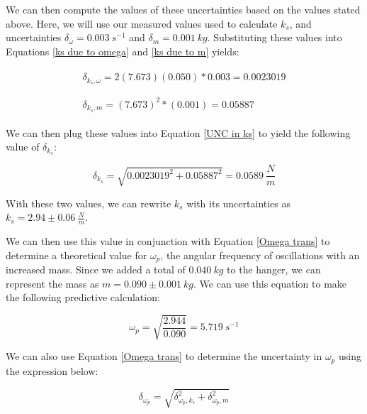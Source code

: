 \documentclass[12pt]{article}
\begin{document}
We can then compute the values of these uncertainties based on the values stated above. Here, we will use our measured values used to calculate $k_s$, and uncertainties $\delta_\omega=0.003\ s^{-1}$ and $\delta_m=0.001\ kg$. Substituting these values into Equations \ref{ks due to omega} and \ref{ks due to m} yields:

\begin{align*}
    \begin{split}
        \delta_{k_s,\omega}=2(7.673)(0.050)*0.003=0.0023019
    \end{split} \\ \\
    \begin{split}
        \delta_{k_s,m}=(7.673)^2*(0.001)=0.05887
    \end{split}
\end{align*}

We can then plug these values into Equation \ref{UNC in ks} to yield the following value of $\delta_{k_s}$:

\begin{equation*}
    \delta_{k_s}=\sqrt{0.0023019^2+0.05887^2}=0.0589\ \frac{N}{m}
\end{equation*}

\noindent With these two values, we can rewrite $k_s$ with its uncertainties as $k_s=2.94\pm0.06\ \frac{N}{m}$. \par

We can then use this value in conjunction with Equation \ref{Omega trans} to determine a theoretical value for $\omega_p$, the angular frequency of oscillations with an increased mass. Since we added a total of $0.040\ kg$ to the hanger, we can represent the mass as $m=0.090\pm0.001\ kg$. We can use this equation to make the following predictive calculation:

\begin{equation*}
    \omega_p=\sqrt{\frac{2.944}{0.090}}=5.719\ s^{-1}
\end{equation*}

\noindent We can also use Equation \ref{Omega trans} to determine the uncertainty in $\omega_p$ using the expression below:

\begin{equation}
    \delta_{\omega_p}=\sqrt{\delta_{\omega_p,k_s}^2+\delta_{\omega_p,m}^2} \label{UNC in omega p}
\end{equation}
\end{document}
